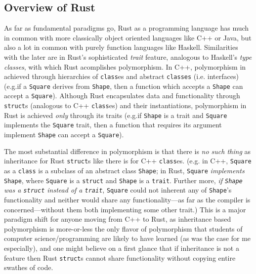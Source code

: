 \documentclass{report}
\begin{document}
\subsection{Overview of Rust}\label{s:rust-overview}

As far as fundamental paradigms go, Rust as a programming language has much in
common with more classically object oriented languages like C++ or Java, but
also a lot in common with purely function languages like Haskell.
Similarities with the later are in Rust's sophisticated \emph{trait} feature,
analogous to Haskell's \emph{type classes}, with which Rust acomplishes
polymorphism.
In C++, polymorphism in achieved through hierarchies of \Verb+class+es and
abstract \Verb+classes+ (i.e. interfaces)
(e.g.\@ if a \Verb+Square+ derives from \Verb+Shape+, then a function which
accepts a \Verb+Shape+ can accept a \Verb+Square+).
Although Rust encapsulates data and functionality through \Verb+struct+s
(analogous to C++ \Verb+class+es) and their instantiations,
polymorphism in Rust is achieved \emph{only} through its traits
(e.g.\@ if \Verb+Shape+ is a trait and \Verb+Square+ implements the \Verb+Square+
trait, then a function that requires its argument implement \Verb+Shape+ can
accept a \Verb+Square+).

The most substantial difference in polymorphism is that there is \emph{no such
thing} as inheritance for Rust \Verb+struct+s like there is for C++
\Verb+class+es. (e.g. in C++, \Verb+Square+ as a \Verb+class+ is a subclass of
an abstract class \Verb+Shape+;
in Rust, \Verb+Square+ \emph{implements} \Verb+Shape+, where \Verb+Square+ is a
\Verb+struct+ and \Verb+Shape+ is a \Verb+trait+. Further more, \emph{if
\Verb+Shape+ was a \Verb+struct+ instead of a \Verb+trait+},
\Verb+Square+ could not inherent any of \Verb+Shape+'s functionality and neither
would share any functionality---as far as the compiler is concerned---without
them both implementing some other trait.)
This is a major paradigm shift for anyone moving from C++ to Rust, as
inheritance based polymorphism is more-or-less the only flavor of polymorphism
that students of computer science/programming are likely to have learned (as was
the case for me especially), and one might believe on a first glance that if
inheritance is not a feature then Rust \Verb+struct+s cannot share functionality
without copying entire swathes of code.
\end{document}
